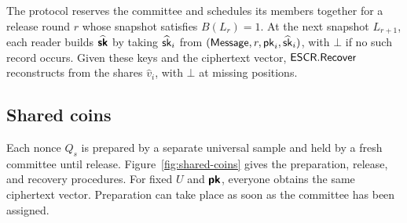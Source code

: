 The protocol reserves the committee and schedules its members together
for a release round $r$ whose snapshot satisfies $B(L_r)=1$.
At the next snapshot $L_{r+1}$, each reader builds
$\widehat{\boldsymbol{\mathsf{sk}}}$ by taking $\widehat{\mathsf{sk}}_i$ from
$(\mathsf{Message},r,\mathsf{pk}_i,\widehat{\mathsf{sk}}_i)$, with $\bot$ if no such record
occurs.  Given these keys and the ciphertext vector, $\mathsf{ESCR}.\mathsf{Recover}$
reconstructs from the shares $\widehat v_i$, with $\bot$ at missing
positions.

\subsection{Shared coins}
\label{sec:shared-coins}

Each nonce $Q_s$ is prepared by a separate universal sample and held by
a fresh committee until release.  Figure~\ref{fig:shared-coins} gives
the preparation, release, and recovery procedures.
For fixed $U$ and $\boldsymbol{\mathsf{pk}}$, everyone obtains the same ciphertext
vector.  Preparation can take place as soon as the committee has been
assigned.

